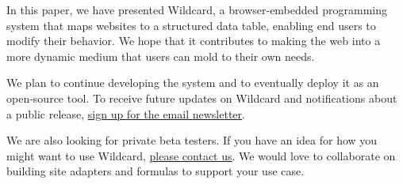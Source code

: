 \documentclass[english,submission]{programming}
\begin{document}
In this paper, we have presented Wildcard, a browser-embedded
programming system that maps websites to a structured data table,
enabling end users to modify their behavior. We hope that it contributes
to making the web into a more dynamic medium that users can mold to
their own needs.

We plan to continue developing the system and to eventually deploy it as
an open-source tool. To receive future updates on Wildcard and
notifications about a public release, \href{}{sign up for the email
newsletter}.

We are also looking for private beta testers. If you have an idea for
how you might want to use Wildcard, \href{mailto:glitt@mit.edu}{please
contact us}. We would love to collaborate on building site adapters and
formulas to support your use case.

\acks
\printbibliography
\end{document}
